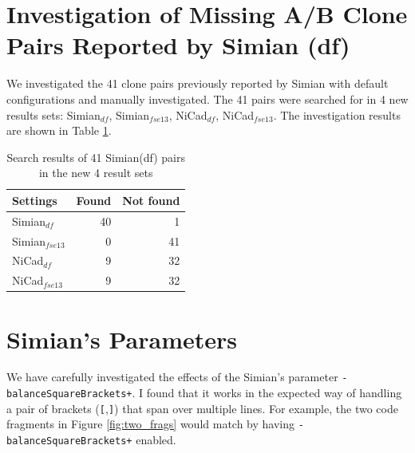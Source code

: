 \documentclass{IEEEtran}
\begin{document}
\section*{Investigation of Missing A/B Clone Pairs Reported by Simian (df)}
We investigated the 41 clone pairs previously reported by Simian with default configurations and manually investigated. The 41 pairs were searched for in 4 new results sets: Simian$_{df}$, Simian$_{fse13}$, NiCad$_{df}$, NiCad$_{fse13}$. The investigation results are shown in Table \ref{tab:search}.

\begin{table}[H]
	\centering
	\caption{Search results of 41 Simian(df) pairs in the new 4 result sets}
	\label{tab:search}
\begin{tabular}{l|r|r}
	\hline 
	Settings & Found & Not found \\ 
	\hline 
	Simian$_{df}$  &  40 & 1 \\ 
	\hline 
	Simian$_{fse13}$ & 0 & 41  \\ 
	\hline 
	NiCad$_{df}$  & 9 & 32 \\ 
	\hline 
	NiCad$_{fse13}$ &  9 & 32 \\ 
	\hline 
\end{tabular} 
\end{table}

\section*{Simian's Parameters}

We have carefully investigated the effects of the Simian's parameter \texttt{-balanceSquareBrackets+}. I found that it works in the expected way of handling a pair of brackets (\texttt{[},\texttt{]}) that span over multiple lines. For example, the two code fragments in Figure \ref{fig:two_frags} would match by having \texttt{-balanceSquareBrackets+} enabled.
\end{document}
